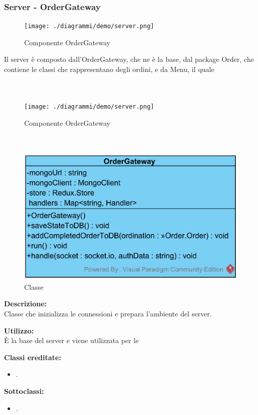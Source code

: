 \subsubsection{Server - OrderGateway}
\begin{figure}[H]
	\centering
	\texttt{[image: ./diagrammi/demo/server.png]}
	\caption{Componente OrderGateway}
\end{figure}
Il server è composto dall'OrderGateway, che ne è la base, dal package Order, che contiene le classi che rappresentano degli ordini, e da Menu, il quale 

\paragraph[::Order]{\class}\mbox{}\\ \label{\class}
\begin{figure}[H]
	\centering
	\texttt{[image: ./diagrammi/demo/server.png]}
	\caption{Componente OrderGateway}
\end{figure}

\paragraph[::Order]{\class}\mbox{}\\ \label{\class}
\begin{figure}[H]
	\centering
	\includegraphics[width=15cm]{./diagrammi/demo/server/ordergateway.png}
	\caption{Classe \class}
\end{figure}
\textbf{Descrizione:}\\
Classe che inizializza le connessioni e prepara l'ambiente del server.

\textbf{Utilizzo:}\\
È la base del server e viene utilizzata per le 

\textbf{Classi ereditate:}
\begin{itemize}
	\item {}.
\end{itemize}

\textbf{Sottoclassi:}
\begin{itemize}
	\item {}.
\end{itemize}

%
